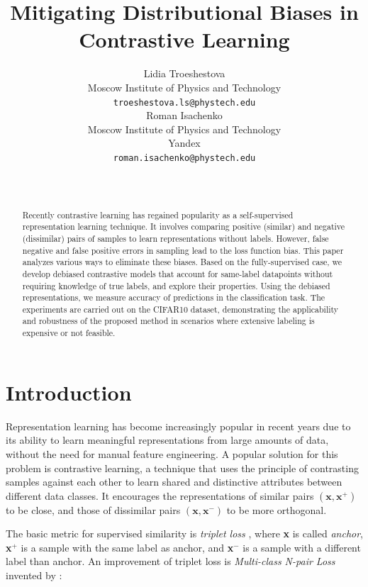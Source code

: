 \documentclass{article}
\title{Mitigating Distributional Biases in Contrastive Learning}
\author{ Lidia Troeshestova \\
	Moscow Institute of Physics and Technology\\
	\texttt{troeshestova.ls@phystech.edu} \\
	\And
        Roman Isachenko\\
        Moscow Institute of Physics and Technology\\
        Yandex\\
	\texttt{roman.isachenko@phystech.edu} \\
	   \\
	\texttt{} \\
}
\date{}
\begin{document}
\nocite{*}
\maketitle

\begin{abstract}
Recently contrastive learning has regained popularity as a self-supervised representation learning technique. It involves comparing positive (similar) and negative (dissimilar) pairs of samples to learn representations without labels. However, false negative and false positive errors in sampling lead to the loss function bias. This paper analyzes various ways to eliminate these biases. Based on the fully-supervised case, we develop debiased contrastive models that account for same-label datapoints without requiring knowledge of true labels, and explore their properties. Using the debiased representations, we measure accuracy of predictions in the classification task. The experiments are carried out on the CIFAR10 dataset, demonstrating the applicability and robustness of the proposed method in scenarios where extensive labeling is expensive or not feasible.
\end{abstract}



\section{Introduction}
Representation learning has become increasingly popular in recent years due to its ability to learn meaningful representations from large amounts of data, without the need for manual feature engineering. A popular solution for this problem is contrastive learning, a technique that uses the principle of contrasting samples against each other to learn shared and distinctive attributes between different data classes. It encourages the representations of similar pairs $(\textbf{x}, \textbf{x}^+)$ to be close, and those of dissimilar pairs $(\textbf{x}, \textbf{x}^-)$ to be more orthogonal.

The basic metric for supervised similarity is \textit{triplet loss} \citep{Schroff_2015}, where \textbf{x} is called \textit{anchor}, \textbf{x}$^+$ is a sample with the same label as anchor, and \textbf{x}$^-$ is a sample with a different label than anchor. An improvement of triplet loss is \textit{Multi-class N-pair Loss} invented by \citep{NIPS2016_6b180037}:
\end{document}
